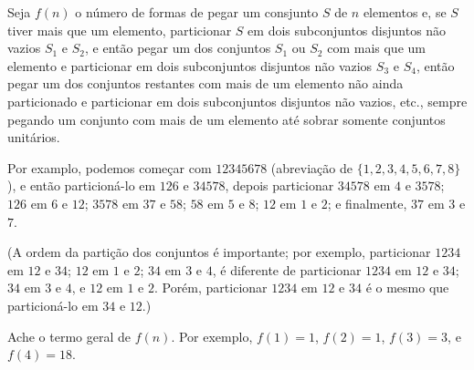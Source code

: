 Seja $f(n)$ o número de formas de pegar um consjunto $S$ de $n$ elementos e, se $S$ tiver mais que um elemento, particionar $S$ em dois subconjuntos disjuntos não vazios $S_1$ e $S_2$, e então pegar um dos conjuntos $S_1$ ou $S_2$ com mais que um elemento e particionar em dois subconjuntos disjuntos não  vazios $S_3$ e $S_4$, então pegar um dos conjuntos restantes com mais de um elemento não ainda particionado e particionar em dois subconjuntos disjuntos não vazios, etc., sempre pegando um conjunto com mais de um elemento até sobrar somente conjuntos unitários.

Por examplo, podemos começar com $12345678$ (abreviação de $\{1, 2, 3, 4, 5, 6, 7, 8\}$), e então particioná-lo em $126$ e $34578$, depois particionar $34578$ em $4$ e $3578$; $126$ em $6$ e $12$; $3578$ em $37$ e $58$; $58$ em $5$ e $8$; $12$ em $1$ e $2$; e finalmente, $37$ em $3$ e $7$.

(A ordem da partição dos conjuntos é importante; por exemplo, particionar $1234$ em $12$ e $34$; $12$ em $1$ e $2$; $34$ em $3$ e $4$, é diferente de particionar $1234$ em $12$ e $34$; $34$ em $3$ e $4$, e $12$ em $1$ e $2$.
Porém, particionar $1234$ em $12$ e $34$ é o mesmo que particioná-lo em $34$ e $12$.)

Ache o termo geral de $f(n)$. Por exemplo, $f(1) = 1$, $f(2) = 1$, $f(3) = 3$, e $f (4) = 18$.
